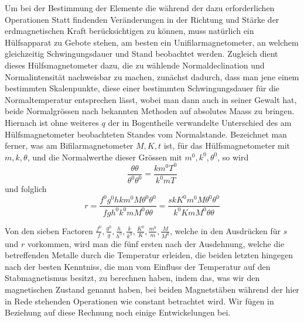 Um bei der Bestimmung der Elemente die während der dazu erforderlichen Operationen Statt findenden Veränderungen in der Richtung und Stärke der erdmagnetischen Kraft berücksichtigen zu können, muss natürlich ein Hülfsapparat zu Gebote stehen, am besten ein Unifilarmagnetometer, an welchem gleichzeitig Schwingungsdauer und Stand beobachtet werden. Zugleich dient dieses Hülfsmagnetometer dazu, die zu wählende Normaldeclination und Normalintensität nachweisbar zu machen, zunächst dadurch, dass man jene einem bestimmten Skalenpunkte, diese einer bestimmten Schwingungsdauer für die Normaltemperatur entsprechen lässt, wobei man dann auch in seiner Gewalt hat, beide Normalgrössen nach bekannten Methoden auf absolutes Maass zu bringen. Hiernach ist ohne weiteres $q$ der in Bogentheile verwandelte Unterschied des am Hülfsmagnetometer beobachteten Standes vom Normalstande. Bezeichnet man ferner, was am Bifilarmagnetometer $M,K,t$ ist, für das Hülfsmagnetometer mit $m,k,\theta$, und die Normalwerthe dieser Grössen mit $m^0,k^0,\theta^0$, so wird
\[
\frac{\theta\theta}{\theta^0\theta^0}=\frac{km^0T^0}{k^0mT}
\]
und folglich
\[
r=\frac{f^0g^0hkm^0M\theta^0\theta^0}{fgh^0k^0mM^0\theta\theta}=\frac{skK^0m^0M\theta^0\theta^0}{k^0KmM^0\theta\theta}
\]

Von den sieben Factoren $\frac{f^0}{f},\frac{g^0}{g},\frac{h}{h^0},\frac{k}{k^0},\frac{K^0}{K},\frac{m^0}{m},\frac{M}{M^0}$, welche in den Ausdrücken für $s$ und $r$ vorkommen, wird man die fünf ersten nach der Ausdehnung, welche die betreffenden Metalle durch die Temperatur erleiden, die beiden letzten hingegen nach der besten Kenntniss, die man vom Einfluss der Temperatur auf den Stabmagnetismus besitzt, zu berechnen haben, indem das, was wir den magnetischen Zustand genannt haben, bei beiden Magnetstäben während der hier in Rede stehenden Operationen wie constant betrachtet wird. Wir fügen in Beziehung auf diese Rechnung noch einige Entwickelungen bei.

